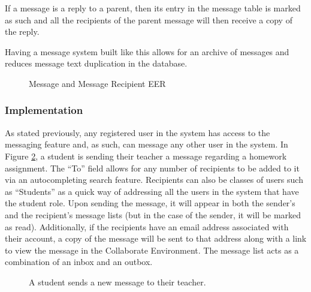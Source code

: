 If a message is a reply to a parent, then its entry in the message table is marked as such and all the recipients of the parent message will then receive a copy of the reply.

Having a message system built like this allows for an archive of messages and reduces message text duplication in the database.

\begin{figure}[h!]
	\centering
	\caption{Message and Message Recipient EER}
	\label{fig:er-message}
\end{figure}

\subsubsection{Implementation}
As stated previously, any registered user in the system has access to the messaging feature and, as such, can message any other user in the system. In Figure \ref{fig:screens-message-new}, a student is sending their teacher a message regarding a homework assignment. The ``To'' field allows for any number of recipients to be added to it via an autocompleting search feature. Recipients can also be classes of users such as ``Students'' as a quick way of addressing all the users in the system that have the student role. Upon sending the message, it will appear in both the sender's and the recipient's message lists (but in the case of the sender, it will be marked as read). Additionally, if the recipients have an email address associated with their account, a copy of the message will be sent to that address along with a link to view the message in the Collaborate Environment. The message list acts as a combination of an inbox and an outbox.

\begin{figure}[h!]
	\centering
	\caption{A student sends a new message to their teacher.}
	\label{fig:screens-message-new}
\end{figure}

